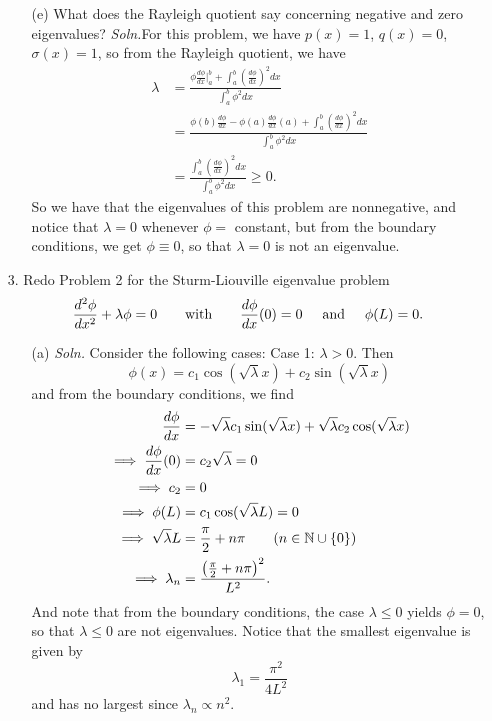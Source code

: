 \documentclass{article}
\begin{document}
\begin{itemize}
\begin{itemize}
        \item[(e)] What does the Rayleigh quotient say concerning negative and zero eigenvalues?
        \newline\newline
        \textit{Soln.}For this problem, we have $p(x) = 1$, $q(x) = 0$, $\sigma(x) = 1$, so from the Rayleigh quotient, we have
        \begin{align*}
            \lambda &= \frac{\phi\frac{d\phi}{dx}\big|_a^b + \int_a^b\left(\frac{d\phi}{dx}\right)^2dx}{\int_a^b\phi^2dx}\\
            &= \frac{\phi(b)\frac{d\phi}{dx} - \phi(a)\frac{d\phi}{dx}(a) + \int_a^b\left(\frac{d\phi}{dx}\right)^2dx}{\int_a^b\phi^2dx}\\
            &= \frac{\int_a^b \left(\frac{d\phi}{dx}\right)^2dx}{\int_a^b \phi^2dx} \geq 0. \tag{B.C.s}
        \end{align*}
        So we have that the eigenvalues of this problem are nonnegative, and notice that $\lambda = 0$ whenever $\phi = $ constant, but from the boundary conditions, we get $\phi \equiv 0$, so that $\lambda = 0$ is not an eigenvalue.
    \end{itemize}
    \pagebreak

    \item[3.] Redo Problem 2 for the Sturm-Liouville eigenvalue problem
    \[\frac{d^2\phi}{dx^2} + \lambda \phi = 0 \hspace{0.7cm} \text{with} \hspace{0.7cm} \frac{d\phi}{dx}(0) = 0 \hspace{0.5cm} \text{and} \hspace{0.5cm} \phi(L) = 0.\]
    \begin{itemize}
        \item[(a)] \textit{Soln.} Consider the following cases:
        \newline
        Case 1: $\lambda > 0$. Then
        \[\phi(x) = c_1\cos(\sqrt{\lambda}x) + c_2\sin(\sqrt{\lambda}x)\]
        and from the boundary conditions, we find
        \begin{align*}
            \frac{d\phi}{dx} &= -\sqrt{\lambda}c_1\sin(\sqrt{\lambda}x) + \sqrt{\lambda}c_2\cos(\sqrt{\lambda}x)\\
            \implies \frac{d\phi}{dx}(0) &= c_2\sqrt{\lambda} = 0 \\
            \implies c_2 &= 0\\
            \implies \phi(L) &= c_1\cos(\sqrt{\lambda}L) = 0\\
            \implies \sqrt{\lambda}L &= \frac{\pi}{2} + n\pi \tag{$n \in \mathbb{N} \cup \{0\}$}\\
            \implies \lambda_n &= \frac{\left(\frac{\pi}{2} + n\pi\right)^2}{L^2}.
        \end{align*}
        And note that from the boundary conditions, the case $\lambda \leq 0$ yields $\phi = 0$, so that $\lambda \leq 0$ are not eigenvalues. Notice that the smallest eigenvalue is given by
        \[\lambda_1 = \frac{\pi^2}{4L^2}\]
        and has no largest since $\lambda_n \propto n^2$.
        \newline\newline


\end{itemize}
\end{itemize}
\end{document}
